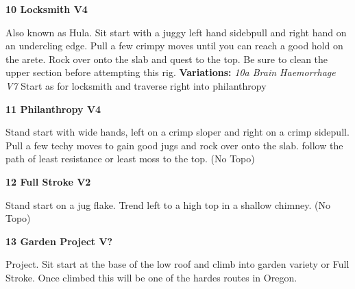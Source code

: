 \begin{multicols}{2}
					\label{rt:Locksmith} \colorbox{RoyalBlue!20}{\textbf{10 Locksmith V4 \ding{72}    \warn \warn }}
					\begin{adjustwidth}{1cm}{}
					Also known as Hula. Sit start with a juggy left hand sidebpull and right hand on an undercling edge. Pull a few crimpy moves until you can reach a good hold on the arete. Rock over onto the slab and quest to the top. Be sure to clean the upper section before attempting this rig.
					\newline \textbf{Variations:} \newline
						\label{vr:Brain Haemorrhage} \colorbox{Goldenrod!50}{\emph{10a Brain Haemorrhage V7  }}
						Start as for locksmith and traverse right into philanthropy
					\end{adjustwidth}
					\label{rt:Philanthropy} \colorbox{RoyalBlue!20}{\textbf{11 Philanthropy V4   \warn \warn }}
					\begin{adjustwidth}{1cm}{}
					Stand start with wide hands, left on a crimp sloper and right on a crimp sidepull. Pull a few techy moves to gain good jugs and rock over onto the slab. follow the path of least resistance or least moss to the top.
						\newline (No Topo) 
					\end{adjustwidth}
					\label{rt:Full Stroke} \colorbox{green!20}{\textbf{12 Full Stroke V2 \ding{72}   \warn }}
					\begin{adjustwidth}{1cm}{}
					Stand start on a jug flake. Trend left to a high top in a shallow chimney.
						\newline (No Topo) 
					\end{adjustwidth}
					\label{rt:Garden Project} \colorbox{black!20}{\textbf{13 Garden Project V?  }}
					\begin{adjustwidth}{1cm}{}
					Project. Sit start at the base of the low roof and climb into garden variety or Full Stroke. Once climbed this will be one of the hardes routes in Oregon.
					\end{adjustwidth}


\end{multicols}
